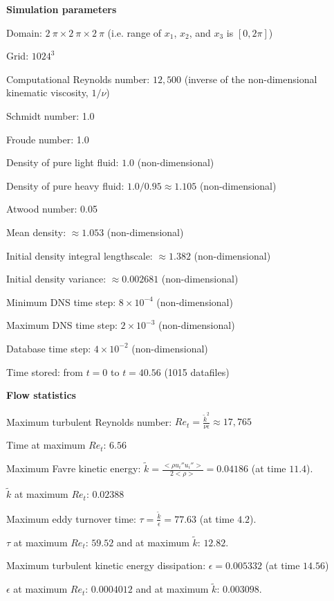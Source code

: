 \documentclass[11pt]{article}
\begin{document}
\vskip 0.2in

{\bf Simulation parameters}

Domain: $2\ \pi \times 2\ \pi \times 2\ \pi$ (i.e. range of $x_1$, $x_2$, and
$x_3$ is $[0,2\pi ]$)

Grid: $1024^3$

Computational Reynolds number: $12,500$ (inverse of the non-dimensional 
kinematic viscosity, $1/\nu$)

Schmidt number: 1.0

Froude number: 1.0

Density of pure light fluid: $1.0$ (non-dimensional)

Density of pure heavy fluid: $1.0/0.95 \approx 1.105$ (non-dimensional)

Atwood number: 0.05

Mean density: $\approx 1.053$ (non-dimensional)

Initial density integral lengthscale: $\approx 1.382$ (non-dimensional)

Initial density variance: $\approx 0.002681$ (non-dimensional) 

Minimum DNS time step: $8 \times 10^{-4}$ (non-dimensional)

Maximum DNS time step: $2 \times 10^{-3}$ (non-dimensional)

Database time step: $4 \times 10^{-2}$ (non-dimensional)

Time stored: from $t=0$ to $t=40.56$ (1015 datafiles)


\vskip 0.2in

{\bf Flow statistics}

Maximum turbulent Reynolds number: 
$Re_t = \frac{\tilde{k}^2}{\nu \epsilon} \approx 17,765$

Time at maximum $Re_t$: $6.56$

Maximum Favre kinetic energy: $\tilde{k}= 
\frac{<\rho u_i'' u_i''>}{2 <\rho>} = 0.04186$ (at time $11.4$).

$\tilde{k}$ at maximum $Re_t$: $0.02388$

Maximum eddy turnover time: $\tau = \frac{\tilde{k}}{\epsilon}=77.63$
(at time $4.2$).

$\tau$ at maximum $Re_t$: $59.52$ and at maximum $\tilde{k}$: $12.82$.

Maximum turbulent kinetic energy dissipation: $\epsilon=0.005332$ (at time
$14.56$)

$\epsilon$ at maximum $Re_t$: $0.0004012$ and at maximum $\tilde{k}$: 
$0.003098$.

\vskip 0.2in
\end{document}
